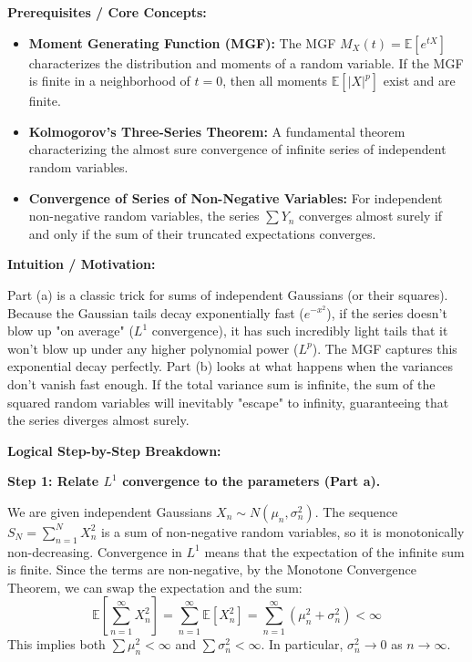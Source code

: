 \begin{solution}
\textbf{Prerequisites / Core Concepts:}
\begin{itemize}
    \item \textbf{Moment Generating Function (MGF):} The MGF $M_X(t) = \mathbb{E}[e^{tX}]$ characterizes the distribution and moments of a random variable. If the MGF is finite in a neighborhood of $t=0$, then all moments $\mathbb{E}[|X|^p]$ exist and are finite.
    \item \textbf{Kolmogorov's Three-Series Theorem:} A fundamental theorem characterizing the almost sure convergence of infinite series of independent random variables.
    \item \textbf{Convergence of Series of Non-Negative Variables:} For independent non-negative random variables, the series $\sum Y_n$ converges almost surely if and only if the sum of their truncated expectations converges.
\end{itemize}

\textbf{Intuition / Motivation:}

Part (a) is a classic trick for sums of independent Gaussians (or their squares). Because the Gaussian tails decay exponentially fast ($e^{-x^2}$), if the series doesn't blow up "on average" ($L^1$ convergence), it has such incredibly light tails that it won't blow up under any higher polynomial power ($L^p$). The MGF captures this exponential decay perfectly. Part (b) looks at what happens when the variances don't vanish fast enough. If the total variance sum is infinite, the sum of the squared random variables will inevitably "escape" to infinity, guaranteeing that the series diverges almost surely.

\textbf{Logical Step-by-Step Breakdown:}

\textbf{Step 1: Relate $L^1$ convergence to the parameters (Part a).}

We are given independent Gaussians $X_n \sim N(\mu_n, \sigma_n^2)$.
The sequence $S_N = \sum_{n=1}^N X_n^2$ is a sum of non-negative random variables, so it is monotonically non-decreasing.
Convergence in $L^1$ means that the expectation of the infinite sum is finite. Since the terms are non-negative, by the Monotone Convergence Theorem, we can swap the expectation and the sum:
\[ \mathbb{E}\left[ \sum_{n=1}^\infty X_n^2 \right] = \sum_{n=1}^\infty \mathbb{E}[X_n^2] = \sum_{n=1}^\infty (\mu_n^2 + \sigma_n^2) < \infty \]
This implies both $\sum \mu_n^2 < \infty$ and $\sum \sigma_n^2 < \infty$. In particular, $\sigma_n^2 \to 0$ as $n \to \infty$.


\end{solution}
